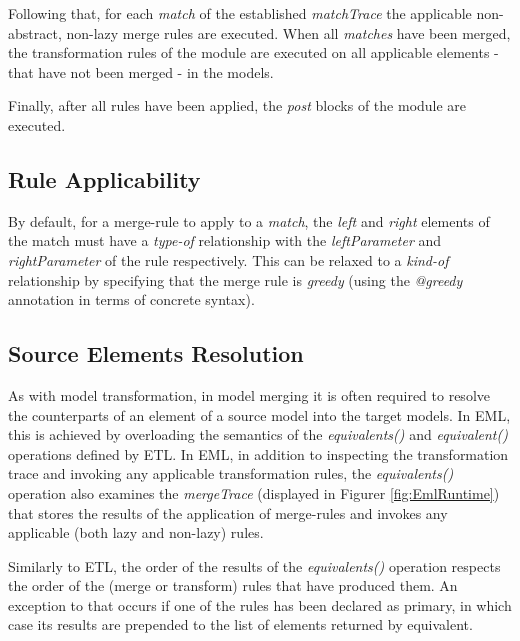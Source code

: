 Following that, for each \emph{match} of the established \emph{matchTrace} the applicable non-abstract, non-lazy merge rules are executed. When all \emph{matches} have been merged, the transformation rules of the module are executed on all applicable elements - that have not been merged - in the models.

Finally, after all rules have been applied, the \emph{post} blocks of the module are executed.

\subsection{Rule Applicability}
By default, for a merge-rule to apply to a \emph{match}, the \emph{left} and \emph{right} elements of the match must have a \emph{type-of} relationship with the \emph{leftParameter} and \emph{rightParameter} of the rule respectively. This can be relaxed to a \emph{kind-of} relationship by specifying that the merge rule is \emph{greedy} (using the \emph{@greedy} annotation in terms of concrete syntax).

\subsection{Source Elements Resolution}

As with model transformation, in model merging it is often required to resolve the counterparts of an element of a source model into the target models. In EML, this is achieved by overloading the semantics of the \emph{equivalents()} and \emph{equivalent()} operations defined by ETL. In EML, in addition to inspecting the transformation trace and invoking any applicable transformation rules, the \emph{equivalents()} operation also examines the \emph{mergeTrace} (displayed in Figurer \ref{fig:EmlRuntime}) that stores the results of the application of merge-rules and invokes any applicable (both lazy and non-lazy) rules.

Similarly to ETL, the order of the results of the \emph{equivalents()} operation respects the order of the (merge or transform) rules that have produced them. An exception to that occurs if one of the rules has been declared as primary, in which case its results are prepended to the list of elements returned by equivalent.

